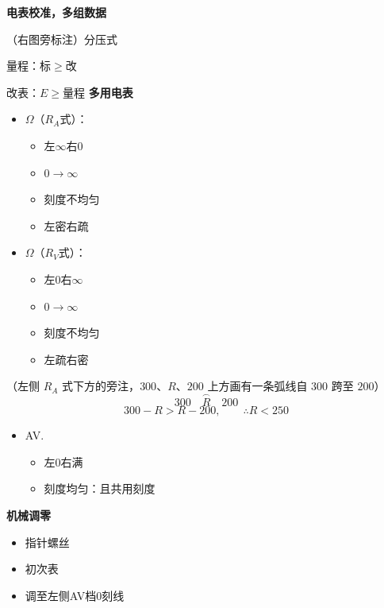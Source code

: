\textbf{电表校准，多组数据}


（右图旁标注）分压式

量程：标$\ge$改

改表：$E\ge$量程
\textbf{多用电表}

\begin{itemize}
\item $\Omega$（$R_A$式）：
  \begin{itemize}
  \item 左$\infty$右$0$
  \item $0\to\infty$
  \item 刻度不均匀
  \item 左密右疏
  \end{itemize}
\item $\Omega$（$R_V$式）：
  \begin{itemize}
  \item 左$0$右$\infty$
  \item $0\to\infty$
  \item 刻度不均匀
  \item 左疏右密
  \end{itemize}
\end{itemize}

（左侧 $R_A$ 式下方的旁注，$300$、$R$、$200$ 上方画有一条弧线自 $300$ 跨至 $200$）
\[
\overset{\frown}{300\quad R\quad 200}
\]
\[
300-R>R-200,\qquad \therefore R<250
\]

\begin{itemize}
\item AV.
  \begin{itemize}
  \item 左$0$右满
  \item 刻度均匀：且共用刻度
  \end{itemize}
\end{itemize}
\textbf{机械调零}
\begin{itemize}
\item 指针螺丝
\item 初次表
\item 调至左侧AV档0刻线
\end{itemize}


